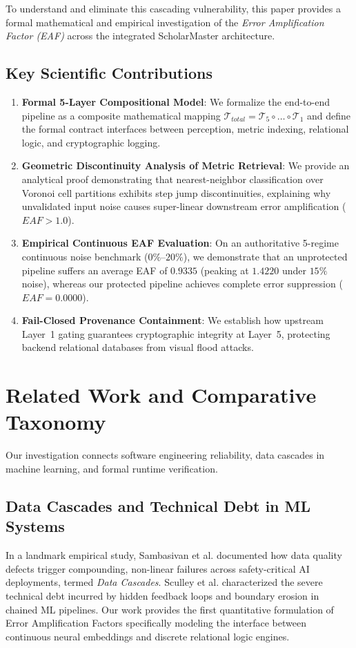 \documentclass[10pt,journal,compsoc]{IEEEtran}
\begin{document}
To understand and eliminate this cascading vulnerability, this paper provides a formal mathematical and empirical investigation of the \textit{Error Amplification Factor (EAF)} across the integrated ScholarMaster architecture.

\subsection{Key Scientific Contributions}
\begin{enumerate}
    \item \textbf{Formal 5-Layer Compositional Model}: We formalize the end-to-end pipeline as a composite mathematical mapping $\mathcal{T}_{total} = \mathcal{T}_5 \circ \dots \circ \mathcal{T}_1$ and define the formal contract interfaces between perception, metric indexing, relational logic, and cryptographic logging.
    \item \textbf{Geometric Discontinuity Analysis of Metric Retrieval}: We provide an analytical proof demonstrating that nearest-neighbor classification over Voronoi cell partitions exhibits step jump discontinuities, explaining why unvalidated input noise causes super-linear downstream error amplification ($EAF > 1.0$).
    \item \textbf{Empirical Continuous EAF Evaluation}: On an authoritative 5-regime continuous noise benchmark ($0\%\text{--}20\%$), we demonstrate that an unprotected pipeline suffers an average EAF of $0.9335$ (peaking at $1.4220$ under $15\%$ noise), whereas our protected pipeline achieves complete error suppression ($EAF = 0.0000$).
    \item \textbf{Fail-Closed Provenance Containment}: We establish how upstream Layer~1 gating guarantees cryptographic integrity at Layer~5, protecting backend relational databases from visual flood attacks.
\end{enumerate}

\section{Related Work and Comparative Taxonomy}
Our investigation connects software engineering reliability, data cascades in machine learning, and formal runtime verification.

\subsection{Data Cascades and Technical Debt in ML Systems}
In a landmark empirical study, Sambasivan et al. \cite{sambasivan2021everyone} documented how data quality defects trigger compounding, non-linear failures across safety-critical AI deployments, termed \textit{Data Cascades}. Sculley et al. \cite{sculley2015hidden} characterized the severe technical debt incurred by hidden feedback loops and boundary erosion in chained ML pipelines. Our work provides the first quantitative formulation of Error Amplification Factors specifically modeling the interface between continuous neural embeddings and discrete relational logic engines.
\end{document}
